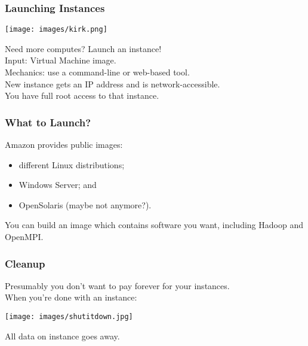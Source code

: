 \begin{frame}
  \frametitle{Launching Instances}
  
  \begin{center}
	\texttt{[image: images/kirk.png]}
\end{center}

  
Need more computes? Launch an instance!\\[1em]

Input: Virtual Machine image.\\[1em]

Mechanics: use a command-line or web-based tool.\\[1em]

New instance gets an IP address and is network-accessible. \\
You have full root access to that instance.
  
\end{frame}

\begin{frame}
  \frametitle{What to Launch?}

  
Amazon provides public images:
\begin{itemize}
\item different Linux distributions;
\item Windows Server; and
\item OpenSolaris (maybe not anymore?). 
\end{itemize}

You can build an image which contains software you
want, including Hadoop and OpenMPI.
  
\end{frame}

\begin{frame}
  \frametitle{Cleanup}

  
Presumably you don't want to pay forever for your instances.\\[1em]

When you're done with an instance:

\begin{center}
	\texttt{[image: images/shutitdown.jpg]}
\end{center}


All data on instance goes away.
  
\end{frame}

